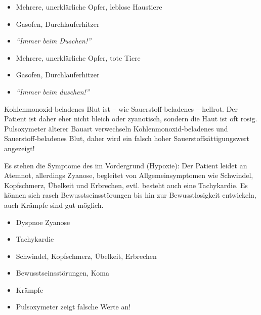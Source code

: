 {
\begin{itemize}
    \item Mehrere, unerklärliche Opfer, leblose Haustiere
    \item Gasofen, Durchlauferhitzer
    \item \emph{\enquote{Immer beim Duschen!}}
\end{itemize}
}{
\begin{itemize}
    \item Mehrere, unerklärliche Opfer, tote Tiere
    \item Gasofen, Durchlauferhitzer
    \item \emph{\enquote{Immer beim duschen!}}
\end{itemize}
}{}{}{}

{%
Kohlenmonoxid-beladenes Blut ist -- wie
Sauerstoff-beladenes -- hellrot. Der Patient ist daher eher
nicht bleich oder zyanotisch, sondern die Haut ist oft rosig.
Pulsoxymeter älterer Bauart verwechseln
Kohlenmonoxid-beladenes und Sauerstoff-beladenes Blut, daher
wird ein falsch hoher Sauerstoffsättigungswert angezeigt!

Es stehen die Symptome des  im
Vordergrund (Hypoxie): Der Patient leidet an Atemnot,
allerdings  Zyanose, begleitet von
Allgemeinsymptomen wie Schwindel, Kopfschmerz, Übelkeit und
Erbrechen, evtl. besteht auch eine Tachykardie.
Es können sich rasch Bewusstseinsstörungen bis hin zur
Bewusstlosigkeit entwickeln, auch Krämpfe sind gut möglich.
}{
\begin{itemize}
  \item Dyspnoe    Zyanose
  \item Tachykardie
  \item Schwindel, Kopfschmerz, Übelkeit, Erbrechen
  \item Bewusstseinsstörungen, Koma
  \item Krämpfe
  \item Pulsoxymeter zeigt falsche Werte an!
\end{itemize}
}{}{}{}


% 


